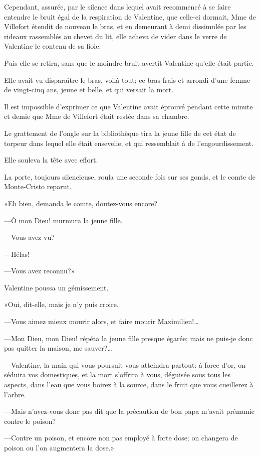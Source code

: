 Cependant, assurée, par le silence dans lequel avait recommencé à se faire entendre le bruit égal de la respiration de Valentine, que celle-ci dormait, Mme de Villefort étendit de nouveau le bras, et en demeurant à demi dissimulée par les rideaux rassemblés au chevet du lit, elle acheva de vider dans le verre de Valentine le contenu de sa fiole. 

Puis elle se retira, sans que le moindre bruit avertît Valentine qu'elle était partie. 

Elle avait vu disparaître le bras, voilà tout; ce bras frais et arrondi d'une femme de vingt-cinq ans, jeune et belle, et qui versait la mort. 

Il est impossible d'exprimer ce que Valentine avait éprouvé pendant cette minute et demie que Mme de Villefort était restée dans sa chambre. 

Le grattement de l'ongle sur la bibliothèque tira la jeune fille de cet état de torpeur dans lequel elle était ensevelie, et qui ressemblait à de l'engourdissement. 

Elle souleva la tête avec effort. 

La porte, toujours silencieuse, roula une seconde fois sur ses gonds, et le comte de Monte-Cristo reparut. 

«Eh bien, demanda le comte, doutez-vous encore? 

—Ô mon Dieu! murmura la jeune fille. 

—Vous avez vu? 

—Hélas! 

—Vous avez reconnu?» 

Valentine poussa un gémissement. 

«Oui, dit-elle, mais je n'y puis croire. 

—Vous aimez mieux mourir alors, et faire mourir Maximilien!\dots 

—Mon Dieu, mon Dieu! répéta la jeune fille presque égarée; mais ne puis-je donc pas quitter la maison, me sauver?\dots 

—Valentine, la main qui vous poursuit vous atteindra partout: à force d'or, on séduira vos domestiques, et la mort s'offrira à vous, déguisée sous tous les aspects, dans l'eau que vous boirez à la source, dans le fruit que vous cueillerez à l'arbre. 

—Mais n'avez-vous donc pas dit que la précaution de bon papa m'avait prémunie contre le poison? 

—Contre un poison, et encore non pas employé à forte dose; on changera de poison ou l'on augmentera la dose.» 

